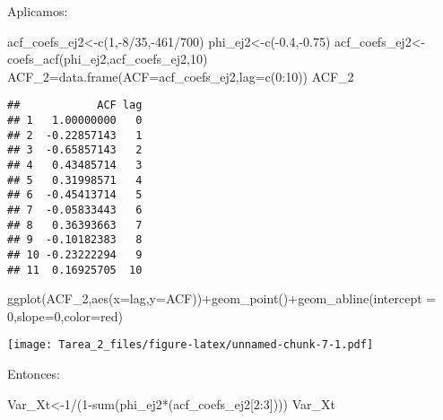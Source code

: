 \documentclass[
]{article}
\newenvironment{Shaded}{\begin{snugshade}}{\end{snugshade}}
\newcommand{\AttributeTok}[1]{\textcolor[rgb]{0.77,0.63,0.00}{#1}}
\newcommand{\DecValTok}[1]{\textcolor[rgb]{0.00,0.00,0.81}{#1}}
\newcommand{\FloatTok}[1]{\textcolor[rgb]{0.00,0.00,0.81}{#1}}
\newcommand{\FunctionTok}[1]{\textcolor[rgb]{0.00,0.00,0.00}{#1}}
\newcommand{\NormalTok}[1]{#1}
\newcommand{\OtherTok}[1]{\textcolor[rgb]{0.56,0.35,0.01}{#1}}
\newcommand{\SpecialCharTok}[1]{\textcolor[rgb]{0.00,0.00,0.00}{#1}}
\newcommand{\StringTok}[1]{\textcolor[rgb]{0.31,0.60,0.02}{#1}}
\begin{document}
Aplicamos:

\begin{Shaded}
\begin{Highlighting}[]
\NormalTok{acf\_coefs\_ej2}\OtherTok{\textless{}{-}}\FunctionTok{c}\NormalTok{(}\DecValTok{1}\NormalTok{,}\SpecialCharTok{{-}}\DecValTok{8}\SpecialCharTok{/}\DecValTok{35}\NormalTok{,}\SpecialCharTok{{-}}\DecValTok{461}\SpecialCharTok{/}\DecValTok{700}\NormalTok{)}
\NormalTok{phi\_ej2}\OtherTok{\textless{}{-}}\FunctionTok{c}\NormalTok{(}\SpecialCharTok{{-}}\FloatTok{0.4}\NormalTok{,}\SpecialCharTok{{-}}\FloatTok{0.75}\NormalTok{)}
\NormalTok{acf\_coefs\_ej2}\OtherTok{\textless{}{-}}\FunctionTok{coefs\_acf}\NormalTok{(phi\_ej2,acf\_coefs\_ej2,}\DecValTok{10}\NormalTok{)}
\NormalTok{ACF\_2}\OtherTok{=}\FunctionTok{data.frame}\NormalTok{(}\AttributeTok{ACF=}\NormalTok{acf\_coefs\_ej2,}\AttributeTok{lag=}\FunctionTok{c}\NormalTok{(}\DecValTok{0}\SpecialCharTok{:}\DecValTok{10}\NormalTok{))}
\NormalTok{ACF\_2}
\end{Highlighting}
\end{Shaded}

\begin{verbatim}
##            ACF lag
## 1   1.00000000   0
## 2  -0.22857143   1
## 3  -0.65857143   2
## 4   0.43485714   3
## 5   0.31998571   4
## 6  -0.45413714   5
## 7  -0.05833443   6
## 8   0.36393663   7
## 9  -0.10182383   8
## 10 -0.23222294   9
## 11  0.16925705  10
\end{verbatim}

\begin{Shaded}
\begin{Highlighting}[]
\FunctionTok{ggplot}\NormalTok{(ACF\_2,}\FunctionTok{aes}\NormalTok{(}\AttributeTok{x=}\NormalTok{lag,}\AttributeTok{y=}\NormalTok{ACF))}\SpecialCharTok{+}\FunctionTok{geom\_point}\NormalTok{()}\SpecialCharTok{+}\FunctionTok{geom\_abline}\NormalTok{(}\AttributeTok{intercept =} \DecValTok{0}\NormalTok{,}\AttributeTok{slope=}\DecValTok{0}\NormalTok{,}\AttributeTok{color=}\StringTok{\textquotesingle{}red\textquotesingle{}}\NormalTok{)}
\end{Highlighting}
\end{Shaded}

\texttt{[image: Tarea\_2\_files/figure-latex/unnamed-chunk-7-1.pdf]}

Entonces:

\begin{Shaded}
\begin{Highlighting}[]
\NormalTok{Var\_Xt}\OtherTok{\textless{}{-}}\DecValTok{1}\SpecialCharTok{/}\NormalTok{(}\DecValTok{1}\SpecialCharTok{{-}}\FunctionTok{sum}\NormalTok{(phi\_ej2}\SpecialCharTok{*}\NormalTok{(acf\_coefs\_ej2[}\DecValTok{2}\SpecialCharTok{:}\DecValTok{3}\NormalTok{])))}
\NormalTok{Var\_Xt}
\end{Highlighting}
\end{Shaded}
\end{document}
